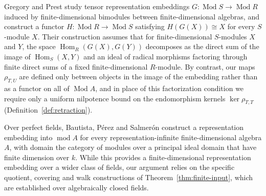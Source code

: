 \documentclass[a4paper,reqno,10pt]{amsart}
\theoremstyle{definition}
\DeclareMathOperator{\Hom}{Hom}
\DeclareMathOperator{\Mod}{Mod}
\DeclareMathOperator{\md}{mod}
\numberwithin{equation}{section}
\begin{document}
Gregory and Prest \cite[Theorem~4.2]{GregoryPrest} study tensor representation embeddings
$G:\Mod S\to\Mod R$ induced by finite-dimensional bimodules between
finite-dimensional algebras, and construct a functor $H:\Mod R\to\Mod S$ satisfying
$H(G(X))\cong X$ for every $S$-module $X$.
Their construction assumes that for finite-dimensional $S$-modules $X$ and $Y$, the space $\Hom_R(G(X),G(Y))$
decomposes as the direct sum of the image of $\Hom_S(X,Y)$ and an ideal of radical morphisms factoring through
finite direct sums of a fixed finite-dimensional $R$-module. By contrast, our maps $\rho_{T,U}$ are defined only between objects in the image
of the embedding rather than as a functor on all of $\Mod A$, and in place
of this factorization condition we require only a uniform nilpotence bound on
the endomorphism kernels $\ker\rho_{T,T}$
(Definition~\ref{def:retraction}).

Over perfect fields, Bautista, P\'erez and Salmer\'on
\cite[Theorem~1.4]{BautistaPerezSalmeron} construct a representation
embedding into $\md A$ for every representation-infinite
finite-dimensional algebra $A$, with domain the category of modules over a
principal ideal domain that have finite dimension over $k$.
While this provides a finite-dimensional representation embedding over a wider class of fields,
our argument relies on the specific quotient, covering and walk constructions
of Theorem~\ref{thm:finite-input}, which are established over
algebraically closed fields.
\end{document}
